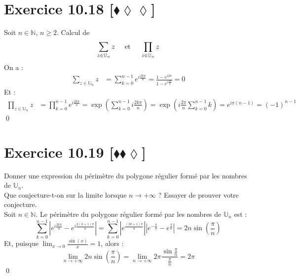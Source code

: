 \documentclass[10pt]{article}
\begin{document}
\section*{Exercice 10.18 [$\blacklozenge\lozenge\lozenge$]}
\begin{tcolorbox}[enhanced, width=7in, center, size=fbox, fontupper=\large, drop shadow southwest]
    Soit $n\in\mathbb{N}$, $n\geq2$. Calcul de
    \begin{equation*}
        \sum_{z\in\mathbb{U}_n}{z} \hspace{0.5cm} \text{et} \hspace{0.5cm} \prod_{z\in\mathbb{U}_n}z
    \end{equation*}
    On a :
    \begin{align*}
        \sum_{z\in\mathbb{U}_n}{z}&=\sum_{k=0}^{n-1}{e^{i\frac{2k\pi}{n}}}=\frac{1-e^{i2\pi}}{1-e^{i\frac{2\pi}{n}}}=0
    \end{align*}
    Et :
    \begin{align*}
        \prod_{z\in\mathbb{U}_n}{z}&=\prod_{k=0}^{n-1}{e^{i\frac{2k\pi}{n}}}=\exp\left( \sum_{k=0}^{n-1}{i\frac{2k\pi}{n}} \right) = \exp\left( i\frac{2\pi}{n}\sum_{k=0}^{n-1}{k} \right)=e^{i\pi(n-1)}=(-1)^{n-1}
    \end{align*}
    \qed
\end{tcolorbox}


\section*{Exercice 10.19 [$\blacklozenge\blacklozenge\lozenge$]}
\begin{tcolorbox}[enhanced, width=7in, center, size=fbox, fontupper=\large, drop shadow southwest]
    Donner une expression du périmètre du polygone régulier formé par les nombres de $\mathbb{U}_n$.\\
    Que conjecture-t-on sur la limite lorsque $n\to+\infty$ ? Essayer de prouver votre conjecture.\\[0.2cm]
    Soit $n\in\mathbb{N}$. Le périmètre du polygone régulier formé par les nombres de $\mathbb{U}_n$ est :
    \begin{equation*}
        \sum_{k=0}^{n-1}{|e^{i\frac{2k\pi}{n}} - e^{i\frac{2(k+1)\pi}{n}}|}=\sum_{k=0}^{n-1}{|e^{\frac{(2k+1)\pi}{n}}||e^{-\frac{\pi}{n}} - e^{\frac{\pi}{n}}|}=2n\sin\left( \frac{\pi}{n} \right)
    \end{equation*}
    Et, puisque $\lim_{x\to0}{\frac{\sin(x)}{x}}=1$, alors :
    \begin{equation*}
        \lim_{n\to+\infty}{2n\sin\left(\frac{\pi}{n}\right)}=\lim_{n\to+\infty}2\pi\frac{\sin\frac{\pi}{n}}{\frac{\pi}{n}}=2\pi
    \end{equation*}
    \qed
\end{tcolorbox}
\end{document}
